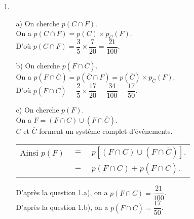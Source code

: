 \begin{itemize}
\item[1.] 
\begin{itemize}
\item[a)] On cherche $p\left(C \cap F\right)$. \\

On a $p\left(C\cap F\right) = p\left(C\right) \times p_C\left(F\right)$. \\

D'où $p\left(C \cap F\right) = \dfrac{3}{5} \times \dfrac{7}{20} = \dfrac{21}{100}$. \\

\item[b)] On cherche $p\left(F \cap \overline{C}\right)$. \\

On a $p\left(F \cap \overline{C}\right) = p\left(\overline{C} \cap F\right) = p\left(\overline{C}\right) \times p_{\overline{C}}\left(F\right)$. \\

D'où $p\left(F \cap \overline{C}\right) = \dfrac{2}{5} \times \dfrac{17}{20} = \dfrac{34}{100} = \dfrac{17}{50}$. \\

\newpage

\item[c)] On cherche $p\left(F\right)$. \\

On a $F = \left(F \cap C\right) \cup \left(F \cap \overline{C}\right)$. \\

$C$ et $\overline{C}$ forment un système complet d'événements. \\

\begin{tabular}{lll}
\hspace*{-.3cm} Ainsi $p\left(F\right)$ & $=$ & $p\left[\left(F \cap C\right) \cup \left(F \cap \overline{C}\right)\right]$. \\
& $=$ & $p\left(F \cap C\right) + p\left(F \cap \overline{C}\right)$. 
\end{tabular}

\vspace*{.3cm}

D'après la question 1.a), on a $p\left(F \cap C\right) = \dfrac{21}{100}$. \\

D'après la question 1.b), on a $p\left(F \cap \overline{C}\right) = \dfrac{17}{50}$. \\


\end{itemize}
\end{itemize}
